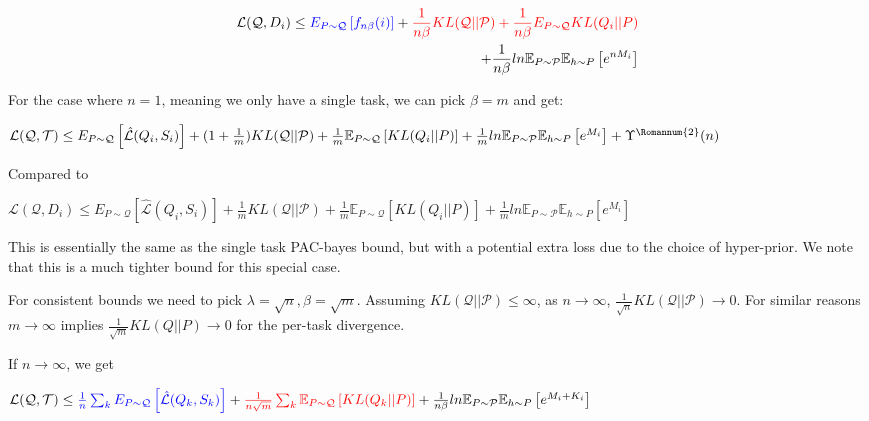 \documentclass[letterpaper]{article}
\theoremstyle{definition}
\begin{document}
\begin{equation*}
\begin{split}
\mathcal{L}(\mathcal{Q}, D_i)\leq \textcolor{blue}{E_{P\sim \mathcal{Q}} \left [ f_{n\beta}(i) \right ]} + \textcolor{red}{\frac{1}{n\beta} KL(\mathcal{Q}||\mathcal{P}) +\frac{1}{n\beta}E_{P\sim \mathcal{Q}} KL(Q_i||P)} \\+ \frac{1}{n\beta} ln\mathbb{E}_{P\sim \mathcal{P}}\mathbb{E}_{h\sim P}\left [ e^{nM_i} \right ]
\end{split}
\end{equation*}

For the case where $n=1$, meaning we only have a single task, we can pick $\beta=m$ and get:

$\mathcal{L}(\mathcal{Q}, \mathcal{T}) \leq  E_{P\sim \mathcal{Q}}  \left [ \hat{\mathcal{L}}(Q_i,S_i) \right ] + (1+\frac{1}{m})KL(\mathcal{Q}||\mathcal{P}) + \frac{1}{m}\mathbb{E}_{P\sim \mathcal{Q}} \left [KL(Q_i||P)\right ] + \frac{1}{m} ln\mathbb{E}_{P\sim \mathcal{P}}\mathbb{E}_{h\sim P}\left [ e^{M_i} \right ] + \Upsilon^{\text{\Romannum{2}}}(n)$

Compared to 


$\mathcal{L}(\mathcal{Q}, D_i)\leq E_{P\sim \mathcal{Q}}  \left [ \hat{\mathcal{L}}(Q_i,S_i) \right ] + \frac{1}{m}KL(\mathcal{Q}||\mathcal{P}) + \frac{1}{m}\mathbb{E}_{P\sim \mathcal{Q}} \left [KL(Q_i||P)\right ] + \frac{1}{m} ln\mathbb{E}_{P\sim \mathcal{P}}\mathbb{E}_{h\sim P}\left [ e^{M_i} \right ] $

This is essentially the same as the single task PAC-bayes bound, but with a potential extra loss due to the choice of hyper-prior. We note that this is a much tighter bound for this special case.

For consistent bounds we need to pick $\lambda=\sqrt{n}, \beta=\sqrt{m}$. Assuming $KL(\mathcal{Q}||\mathcal{P})\leq \infty$, as $n\rightarrow \infty$,  $\frac{1}{\sqrt{n}}KL(\mathcal{Q}||\mathcal{P})\rightarrow 0$. For similar reasons $m\rightarrow \infty$ implies $\frac{1}{\sqrt{m}}KL(Q||P)\rightarrow 0$ for the per-task divergence.


If $n\rightarrow\infty$, we get 

$\mathcal{L}(\mathcal{Q}, \mathcal{T}) \leq \textcolor{blue}{\frac{1}{n}\sum_k E_{P\sim \mathcal{Q}} \left [ \hat{\mathcal{L}}(Q_k,S_k) \right ]} + \textcolor{red}{\frac{1}{n\sqrt{m}}\sum_k \mathbb{E}_{P\sim \mathcal{Q}} \left [KL(Q_k||P) \right ]} + \frac{1}{n\beta} ln\mathbb{E}_{P\sim \mathcal{P}}\mathbb{E}_{h\sim P}\left [ e^{M_i+K_i} \right ]$
\end{document}
